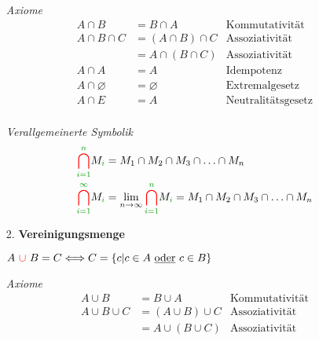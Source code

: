 \begin{itemize}[leftmargin=*]
\begin{minipage}{0.4\columnwidth}
                        \end{minipage}
                    \item[] \textit{Axiome}
                        \begin{align*}
                            A \cap B &= B \cap A & \text{Kommutativität} \\
                            A \cap B \cap C &= (A \cap B) \cap C & \text{Assoziativität}\\
                                            &= A \cap (B \cap C) & \text{Assoziativität}\\
                            A \cap A &= A &    \text{Idempotenz} \\
                        A \cap \varnothing &= \varnothing & \text{Extremalgesetz} \\
                        A \cap E &= A & \text{Neutralitätsgesetz} \\        
                        \end{align*}
                    \item[] \textit{Verallgemeinerte Symbolik}
                        \begin{align*}
                        \textcolor{red}{\bigcap_{\textcolor{green}{i=1}}^{\textcolor{green}{n}}} M_{\textcolor{green}{i}} &= M_1 \cap M_2 \cap M_3 \cap \ldots \cap M_n \\
                        \textcolor{red}{\bigcap_{\textcolor{green}{i=1}}^{\textcolor{green}{\infty}}} M_{\textcolor{green}{i}} &= \lim_{n \to \infty} \textcolor{red}{\bigcap_{\textcolor{green}{i=1}}^{\textcolor{green}{n}}} M_{\textcolor{green}{i}} = M_1 \cap M_2 \cap M_3 \cap \ldots \cap M_n \\        
                        \end{align*}
                    \item[2.] \textbf{Vereinigungsmenge}
                    \item[] $A \ \textcolor{red}{\cup} \ B = C \Longleftrightarrow C = \{c|c \in A ~\text{\underline{oder}}~ c \in B\}$
                    \item[] \textit{Axiome} \begin{align*}
                        A \cup B &= B \cup A & \text{Kommutativität} \\
                        A \cup B \cup C &= (A \cup B) \cup C & \text{Assoziativität} \\
                                        &= A \cup (B \cup C) & \text{Assoziativität} \\

\end{align*}
\end{itemize}
